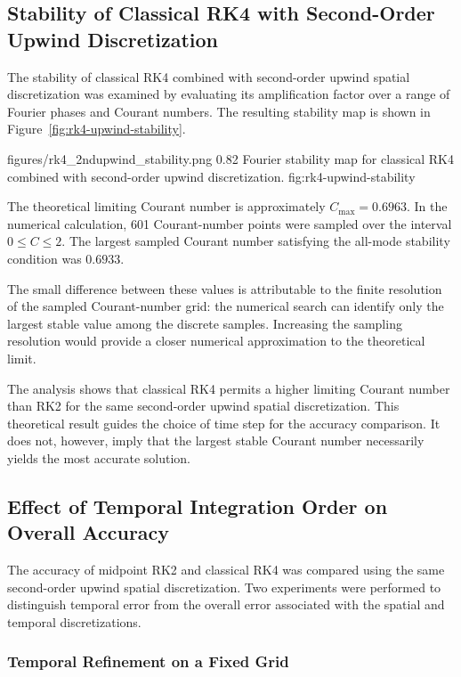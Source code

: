 \subsection{Stability of Classical RK4 with Second-Order Upwind Discretization}
\label{subsec:rk4-stability-results}

The stability of classical RK4 combined with second-order upwind spatial discretization was examined by evaluating its amplification factor over a range of Fourier phases and Courant numbers. The resulting stability map is shown in Figure~\ref{fig:rk4-upwind-stability}.

\resultfigure
    {figures/rk4_2ndupwind_stability.png}
    {0.82}
    {Fourier stability map for classical RK4 combined with second-order upwind discretization.}
    {fig:rk4-upwind-stability}

The theoretical limiting Courant number is approximately $C_{\max}=0.6963$. In the numerical calculation, 601 Courant-number points were sampled over the interval $0\leq C\leq2$. The largest sampled Courant number satisfying the all-mode stability condition was $0.6933$.

The small difference between these values is attributable to the finite resolution of the sampled Courant-number grid: the numerical search can identify only the largest stable value among the discrete samples. Increasing the sampling resolution would provide a closer numerical approximation to the theoretical limit.

The analysis shows that classical RK4 permits a higher limiting Courant number than RK2 for the same second-order upwind spatial discretization. This theoretical result guides the choice of time step for the accuracy comparison. It does not, however, imply that the largest stable Courant number necessarily yields the most accurate solution.

\subsection{Effect of Temporal Integration Order on Overall Accuracy}
\label{subsec:temporal-order-accuracy}

The accuracy of midpoint RK2 and classical RK4 was compared using the same second-order upwind spatial discretization. Two experiments were performed to distinguish temporal error from the overall error associated with the spatial and temporal discretizations.

\subsubsection{Temporal Refinement on a Fixed Grid}
\label{subsubsec:temporal-refinement-fixed-grid}

